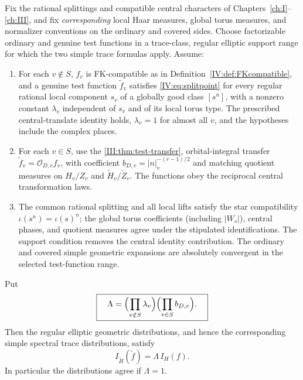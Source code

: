 \begin{proposition}\label{IV:prop:conditionalglobal}
Fix the rational splittings and compatible central characters
of Chapters~\ref{ch:I}--\ref{ch:III}, and fix \emph{corresponding} local Haar measures,
global torus measures, and normalizer conventions on the ordinary
and covered sides.  Choose factorizable ordinary and genuine test
functions in a trace-class, regular elliptic support range for
which the two simple trace formulas apply. Assume:
\begin{enumerate}[label=(\roman*)]
\item For each $v\notin S$, $f_v$ is FK-compatible as in
Definition~\ref{IV:def:FKcompatible}, and a genuine test function
$\widetilde f_v$ satisfies \eqref{IV:eq:splitpoint} for every regular
rational local component $s_v$ of a globally good class $[s^n]$,
with a nonzero constant $\lambda_v$ independent of $s_v$ and of
its local torus type.  The prescribed central-translate identity
holds, $\lambda_v=1$ for almost all $v$, and the hypotheses include
the complex places.
\item For each $v\in S$, use the \cref{III:thm:test-transfer},
orbital-integral transfer $\widetilde f_v=\mathcal O_{D,v}f_v$,
with coefficient $b_{D,v}=|n|_v^{-(r-1)/2}$ and matching quotient
measures on $H_v/Z_v$ and $\widetilde H_v/\widetilde Z_v$.
The functions obey the reciprocal central transformation laws.
\item The common rational splitting and all local lifts satisfy
the star compatibility $\iota(s^n)=\iota(s)^n$; the global torus
coefficients (including $|W_s|$), central phases, and quotient
measures agree under the stipulated identifications.  The support
condition removes the central identity contribution.  The
ordinary and covered simple geometric expansions are absolutely
convergent in the selected test-function range.
\end{enumerate}
Put
\begin{equation}\label{IV:eq:lambda-product}
 \boxed{\quad
 \Lambda=\Bigl(\prod_{v\notin S}\lambda_v\Bigr)
          \Bigl(\prod_{v\in S}b_{D,v}\Bigr).\quad}
\end{equation}
Then the regular elliptic geometric distributions, and hence the
corresponding simple spectral trace distributions, satisfy
\begin{equation}\label{IV:eq:globalLambda}
 \boxed{\quad I_{\widetilde H}(\widetilde f)
              =\Lambda\,I_H(f).\quad}
\end{equation}
In particular the distributions agree if $\Lambda=1$.
\end{proposition}
